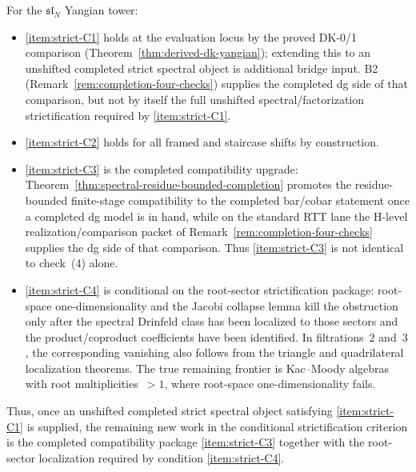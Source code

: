 \begin{remark}[Conditions C1--C4]
\label{rem:spectral-c1c4-status}
For the $\mathfrak{sl}_N$ Yangian tower:
\begin{itemize}
\item \ref{item:strict-C1} holds at
 the evaluation locus by the proved DK-0/1 comparison
 (Theorem~\ref{thm:derived-dk-yangian});
 extending this to an unshifted completed strict spectral object is
 additional bridge input. B2
 (Remark~\ref{rem:completion-four-checks}) supplies the completed dg
 side of that comparison, but not by itself the full unshifted
 spectral/factorization strictification required by
 \ref{item:strict-C1}.
\item \ref{item:strict-C2} holds for all framed and staircase
 shifts by construction.
\item \ref{item:strict-C3} is the completed compatibility upgrade:
 Theorem~\ref{thm:spectral-residue-bounded-completion} promotes the
 residue-bounded finite-stage compatibility to the completed
 bar/cobar statement once a completed dg model is in hand, while on
 the standard RTT lane the H-level realization/comparison packet of
 Remark~\ref{rem:completion-four-checks} supplies the dg side of that
 comparison. Thus \ref{item:strict-C3} is not identical to
 check~(4) alone.
\item \ref{item:strict-C4} is conditional on the root-sector
 strictification package: root-space one-dimensionality and the Jacobi
 collapse lemma kill the obstruction only after the spectral Drinfeld
 class has been localized to those sectors and the product/coproduct
 coefficients have been identified. In filtrations~$2$ and~$3$, the
 corresponding vanishing also follows from the triangle and
 quadrilateral localization theorems.
 The true remaining frontier is Kac--Moody algebras with root
 multiplicities~$> 1$, where root-space one-dimensionality fails.
\end{itemize}
Thus, once an unshifted completed strict spectral object satisfying
\ref{item:strict-C1} is supplied, the remaining new work in the
conditional strictification criterion is the completed compatibility
package \ref{item:strict-C3} together with the root-sector
localization required by condition \ref{item:strict-C4}.
\end{remark}

